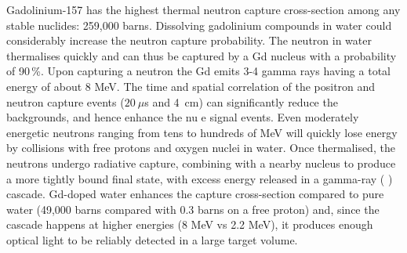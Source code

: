 Gadolinium-157 has the highest thermal neutron capture cross-section among any stable %
nuclides: 259,000 barns.
Dissolving gadolinium compounds in water could considerably increase the neutron capture probability.
The neutron in water thermalises quickly and can thus be captured by a Gd nucleus with a probability of 90\,\%.
Upon capturing a neutron the Gd emits 3-4 gamma rays having a total energy of about 8 MeV.
The time and spatial correlation of the positron and neutron capture events ($20~\mu$s and 4~cm) %
can significantly reduce the backgrounds, and hence enhance the nu e signal events.
Even moderately energetic neutrons ranging from tens to hundreds of MeV will quickly lose energy %
by collisions with free protons and oxygen nuclei in water. 
Once thermalised, the neutrons undergo radiative capture, combining with a nearby nucleus to %
produce a more tightly bound final state, with excess energy released in a gamma-ray ( ) cascade. 
Gd-doped water enhances the capture cross-section compared to pure water %
(49,000 barns compared with 0.3 barns on a free proton) and, since the cascade happens %
at higher energies (8 MeV vs 2.2 MeV), it produces enough optical light to be reliably detected in %
a large target volume.


